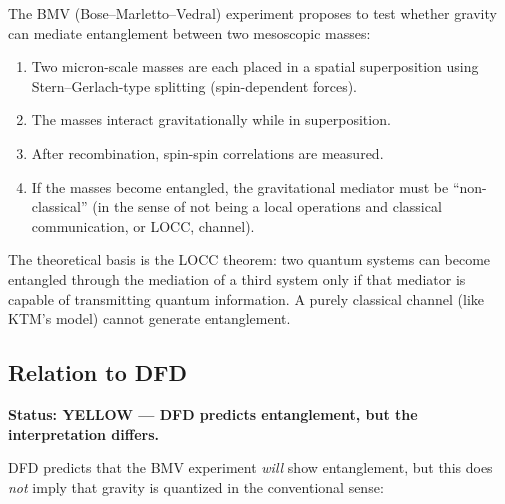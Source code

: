 \documentclass[12pt,a4paper]{article}
\newcommand{\YELLOW}{\textcolor{dfdyellow}{\textbf{YELLOW}}}
\begin{document}
The BMV (Bose--Marletto--Vedral) experiment proposes to test whether gravity can mediate entanglement between two mesoscopic masses:

\begin{enumerate}
\item Two micron-scale masses are each placed in a spatial superposition using Stern--Gerlach-type splitting (spin-dependent forces).
\item The masses interact gravitationally while in superposition.
\item After recombination, spin-spin correlations are measured.
\item If the masses become entangled, the gravitational mediator must be ``non-classical'' (in the sense of not being a local operations and classical communication, or LOCC, channel).
\end{enumerate}

The theoretical basis is the LOCC theorem: two quantum systems can become entangled through the mediation of a third system only if that mediator is capable of transmitting quantum information. A purely classical channel (like KTM's model) cannot generate entanglement.

\subsection{Relation to DFD}

\textbf{Status: \YELLOW{} --- DFD predicts entanglement, but the interpretation differs.}

DFD predicts that the BMV experiment \emph{will} show entanglement, but this does \emph{not} imply that gravity is quantized in the conventional sense:
\end{document}
